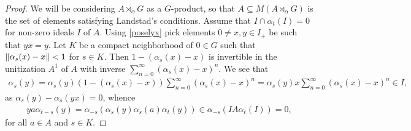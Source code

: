 \begin{proof}
	We will be considering $A \rtimes_\alpha G$ as a $G$-product, so that $A \subseteq M(A \rtimes_\alpha G)$ is the set of elements satisfying Landstad's conditions. Assume that $I \cap \alpha_t(I) = 0$ for non-zero ideals $I$ of $A$. Using \cref{poselyx} pick elements $0 \neq x,y \in I_+$ be such that $yx=y$. Let $K$ be a compact neighborhood of $0 \in G$ such that $ \left\lVert \alpha_s(x)-x\right\rVert < 1$ for $s \in K$. Then $1-(\alpha_s(x)-x)$ is invertible in the unitization $A^1$ of $A$ with inverse $\sum_{n=0}^\infty (\alpha_s(x)-x)^n$. We see that
	\begin{align*}
		\alpha_s(y) = \alpha_s(y)(1-(\alpha_s(x)-x)) \sum_{n=0}^\infty (\alpha_s(x)-x)^n = \alpha_s(y)x \sum_{n=0}^\infty (\alpha_s(x)-x)^n \in I,
	\end{align*}
	as $\alpha_s(y)-\alpha_s(yx)=0$, whence
	\begin{align*}
	y a \alpha_{t-s}(y) = \alpha_{-s}(\alpha_s(y)\alpha_s(a)\alpha_t(y)) \in  \alpha_{-s}(I A \alpha_t(I)) = 0,
	\end{align*}
	for all $a \in A$ and $s \in K$. 
	

\end{proof}
